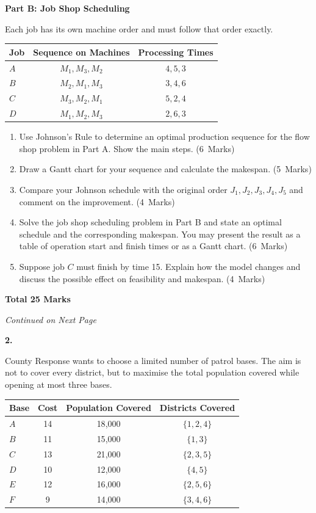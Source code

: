 \documentclass[11pt,a4paper]{article}
\newcommand{\continuednotice}{%
    \vfill
    \begin{center}
    \textit{Continued on Next Page}
    \end{center}
    \newpage
}
\newcommand{\markalloc}[1]{\nobreak\hfill\mbox{(#1 Marks)}}
\newcommand{\questiontotal}[1]{\begin{flushright}\textbf{Total #1 Marks}\end{flushright}}
\begin{document}
\textbf{Part B: Job Shop Scheduling}

Each job has its own machine order and must follow that order exactly.

\begin{center}
\begin{tabular}{lcc}
\toprule
Job & Sequence on Machines & Processing Times \\
\midrule
$A$ & $M_1, M_3, M_2$ & $4, 5, 3$ \\
$B$ & $M_2, M_1, M_3$ & $3, 4, 6$ \\
$C$ & $M_3, M_2, M_1$ & $5, 2, 4$ \\
$D$ & $M_1, M_2, M_3$ & $2, 6, 3$ \\
\bottomrule
\end{tabular}
\end{center}

\begin{enumerate}
\item Use Johnson's Rule to determine an optimal production sequence for the flow shop problem in Part A. Show the main steps. \markalloc{6}

\item Draw a Gantt chart for your sequence and calculate the makespan. \markalloc{5}

\item Compare your Johnson schedule with the original order $J_1,J_2,J_3,J_4,J_5$ and comment on the improvement. \markalloc{4}

\item Solve the job shop scheduling problem in Part B and state an optimal schedule and the corresponding makespan. You may present the result as a table of operation start and finish times or as a Gantt chart. \markalloc{6}

\item Suppose job $C$ must finish by time 15. Explain how the model changes and discuss the possible effect on feasibility and makespan. \markalloc{4}
\end{enumerate}

\questiontotal{25}

\continuednotice

\textbf{2.}

County Response wants to choose a limited number of patrol bases.
The aim is not to cover every district, but to maximise the total population covered while opening at most three bases.

\begin{center}
\begin{tabular}{lccc}
\toprule
Base & Cost & Population Covered & Districts Covered \\
\midrule
$A$ & 14 & 18{,}000 & $\{1,2,4\}$ \\
$B$ & 11 & 15{,}000 & $\{1,3\}$ \\
$C$ & 13 & 21{,}000 & $\{2,3,5\}$ \\
$D$ & 10 & 12{,}000 & $\{4,5\}$ \\
$E$ & 12 & 16{,}000 & $\{2,5,6\}$ \\
$F$ & 9  & 14{,}000 & $\{3,4,6\}$ \\
\bottomrule
\end{tabular}
\end{center}
\end{document}
